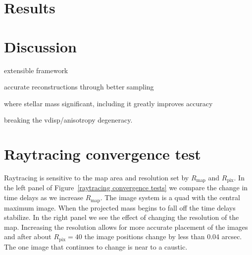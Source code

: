\documentclass[galley]{mn2e}
\newcommand{\Rmap}{\ensuremath{R_\mathrm{map}}}
\newcommand{\Rpix}{\ensuremath{R_\mathrm{pix}}}
\newcommand{\figref}[1] {Figure~\ref{#1}}
\begin{document}


\section{Results} %



\section{Discussion}

extensible framework                                                       

accurate reconstructions through better sampling                           

where stellar mass significant, including it greatly improves accuracy 

breaking the vdisp/anisotropy degeneracy.

\appendix

\section{Raytracing convergence test}
Raytracing is sensitive to the map area and resolution set by $\Rmap$ and
$\Rpix$.  In the left panel of \figref{raytracing convergence tests} we compare
the change in time delays as we increase $\Rmap$.  The image system is a quad
with the central maximum image. When the projected mass begins to fall off the
time delays stabilize. In the right panel we see the effect of changing the
resolution of the map.  Increasing the resolution allows for more accurate
placement of the images and after about $\Rpix=40$ the image positions change
by less than 0.04 arcsec. The one image that continues to change is near to a
caustic.  
\end{document}
